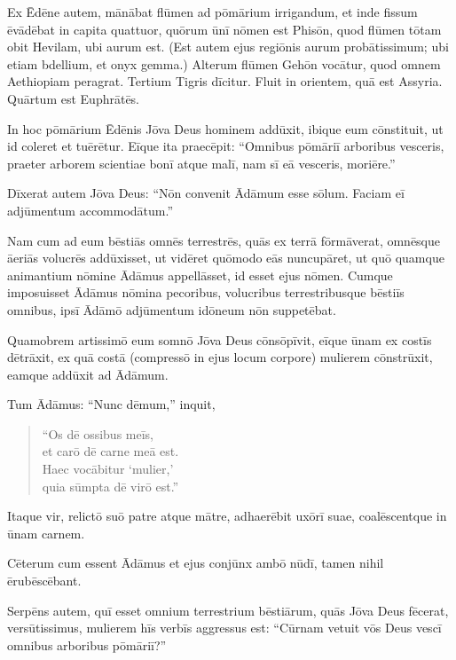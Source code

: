 \Versus Ex Ēdēne autem, mānābat flūmen ad pōmārium irrigandum, et inde fissum ēvādēbat in capita quattuor,
\Versus quōrum ūnī nōmen est Phisōn, quod flūmen tōtam obit Hevilam, ubi aurum est.
\Versus (Est autem ejus regiōnis aurum probātissimum; ubi etiam bdellium, et onyx gemma.)
\Versus Alterum flūmen Gehōn vocātur, quod omnem Aethiopiam peragrat.
\Versus Tertium Tigris dīcitur. Fluit in orientem, quā est Assyria. Quārtum est Euphrātēs.

\Versus In hoc pōmārium Ēdēnis Jōva Deus hominem addūxit, ibique eum cōnstituit, ut id coleret et tuērētur.
\Versus Eīque ita praecēpit: ``Omnibus pōmāriī arboribus vesceris,
\Versus praeter arborem scientiae bonī atque malī, nam sī eā vesceris, moriēre.''

\Versus Dīxerat autem Jōva Deus: ``Nōn convenit Ādāmum esse sōlum. Faciam eī adjūmentum accommodātum.''

\Versus Nam cum ad eum bēstiās omnēs terrestrēs, quās ex terrā fōrmāverat, omnēsque āeriās volucrēs addūxisset, ut vidēret quōmodo eās nuncupāret, ut quō quamque animantium nōmine Ādāmus appellāsset, id esset ejus nōmen.
\Versus Cumque imposuisset Ādāmus nōmina pecoribus, volucribus terrestribusque bēstiīs omnibus, ipsī Ādāmō adjūmentum idōneum nōn suppetēbat.

\Versus Quamobrem artissimō eum somnō Jōva Deus cōnsōpīvit, eīque ūnam ex costīs dētrāxit, ex quā costā (compressō in ejus locum corpore)
\Versus mulierem cōnstrūxit, eamque addūxit ad Ādāmum.

\Versus Tum Ādāmus: ``Nunc dēmum,'' inquit,

\begin{verse}
\begin{patverse*}
 ``Os dē ossibus meīs, \\
 et carō dē carne meā est. \\
 Haec vocābitur `mulier,' \\
 quia sūmpta dē virō est.''
\end{patverse*}
\end{verse}
\Versus Itaque vir, relictō suō patre atque mātre, adhaerēbit uxōrī suae, coalēscentque in ūnam carnem.

\Versus Cēterum cum essent Ādāmus et ejus conjūnx ambō nūdī, tamen nihil ērubēscēbant.



\Caput
\Versus Serpēns autem, quī esset omnium terrestrium bēstiārum, quās Jōva Deus fēcerat, versūtissimus, mulierem hīs verbīs aggressus est: ``Cūrnam vetuit vōs Deus vescī omnibus arboribus pōmāriī?''

